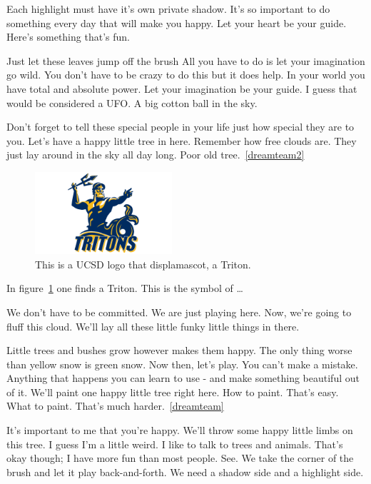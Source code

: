 \documentclass[11pt]{article}
\begin{document}
Each highlight must have it's own private shadow. It's so important to do
something every day that will make you happy. Let your heart be your guide.
Here's something that's fun.

Just let these leaves jump off the brush All you have to do is let your
imagination go wild. You don't have to be crazy to do this but it does help. In
your world you have total and absolute power. Let your imagination be your
guide. I guess that would be considered a UFO. A big cotton ball in the sky.

Don't forget to tell these special people in your life just how special they
are to you. Let's have a happy little tree in here. Remember how free clouds
are. They just lay around in the sky all day long. Poor old
tree.~\ref{dreamteam2}

\begin{figure}[t]
	\begin{center}
		\includegraphics[width=2in]{images/triton.png}
	\end{center}
	\caption{\label{tritonLogo} This is a UCSD logo that displamascot, a Triton.}
\end{figure}
In figure~\ref{tritonLogo} one finds a Triton. This is the symbol of
\dots

We don't have to be committed. We are just playing here. Now, we're going to
fluff this cloud. We'll lay all these little funky little things in there.

Little trees and bushes grow however makes them happy. The only thing worse
than yellow snow is green snow. Now then, let's play. You can't make a mistake.
Anything that happens you can learn to use - and make something beautiful out
of it. We'll paint one happy little tree right here. How to paint. That's easy.
What to paint. That's much harder.~\ref{dreamteam}

It's important to me that you're happy. We'll throw some happy little limbs on
this tree. I guess I'm a little weird. I like to talk to trees and animals.
That's okay though; I have more fun than most people. See. We take the corner
of the brush and let it play back-and-forth. We need a shadow side and a
highlight side.
\end{document}
